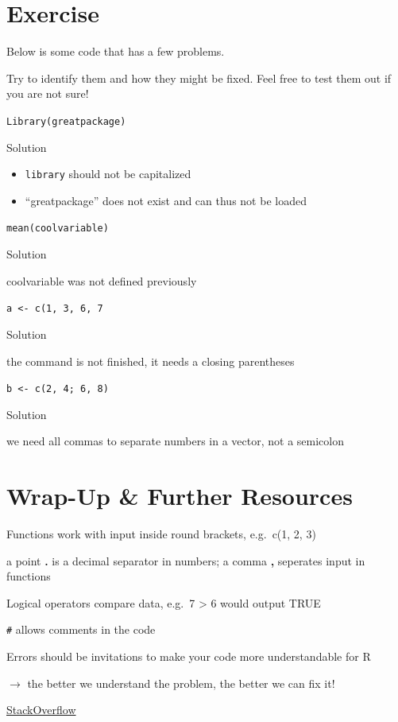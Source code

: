 \documentclass[
]{book}
\providecommand{\tightlist}{%
  \setlength{\itemsep}{0pt}\setlength{\parskip}{0pt}}
\begin{document}
\section{Exercise}\label{exercise-2}

Below is some code that has a few problems.

Try to identify them and how they might be fixed. Feel free to test them out if you are not sure!

\texttt{Library(greatpackage)}

Solution

\begin{itemize}
\tightlist
\item
  \texttt{library} should not be capitalized
\item
  ``greatpackage'' does not exist and can thus not be loaded
\end{itemize}

\texttt{mean(coolvariable)}

Solution

coolvariable was not defined previously

\texttt{a\ \textless{}-\ c(1,\ 3,\ 6,\ 7}

Solution

the command is not finished, it needs a closing parentheses

\texttt{b\ \textless{}-\ c(2,\ 4;\ 6,\ 8)}

Solution

we need all commas to separate numbers in a vector, not a semicolon

\section{Wrap-Up \& Further Resources}\label{wrap-up-further-resources}

Functions work with input inside round brackets, e.g.~c(1, 2, 3)

a point \textbf{.} is a decimal separator in numbers; a comma \textbf{,} seperates input in functions

Logical operators compare data, e.g.~7 \textgreater{} 6 would output TRUE

\texttt{\#} allows comments in the code

Errors should be invitations to make your code more understandable for R

\(\rightarrow\) the better we understand the problem, the better we can fix it!

\href{https://stackoverflow.com/}{StackOverflow}
\end{document}
